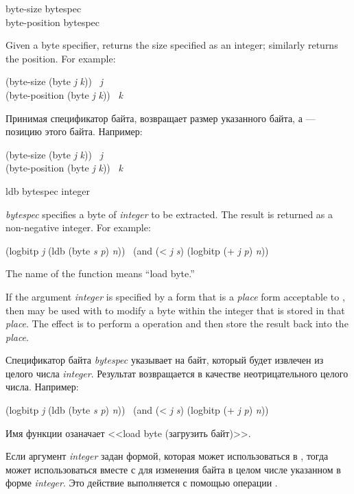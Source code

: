 \begin{defun}[Function]
byte-size bytespec \\
byte-position bytespec

Given a byte specifier,  returns the size specified as an
integer;  similarly returns the position.
For example:
\begin{lisp}
(byte-size (byte \emph{j} \emph{k})) \EQ\ \emph{j} \\
(byte-position (byte \emph{j} \emph{k})) \EQ\ \emph{k}
\end{lisp}

Принимая спецификатор байта,  возвращает размер указанного
байта, а  --- позицию этого байта.
Например:
\begin{lisp}
(byte-size (byte \emph{j} \emph{k})) \EQ\ \emph{j} \\
(byte-position (byte \emph{j} \emph{k})) \EQ\ \emph{k}
\end{lisp}
\end{defun}

\begin{defun}[Function]
ldb bytespec integer

\emph{bytespec} specifies a byte of \emph{integer} to be extracted.
The result is returned as a non-negative integer.
For example:
\begin{lisp}
(logbitp \emph{j} (ldb (byte \emph{s} \emph{p}) \emph{n})) \EQ\ (and (< \emph{j} \emph{s}) (logbitp (+ \emph{j} \emph{p}) \emph{n}))
\end{lisp}
The name of the function  means ``load byte.''

If the argument \emph{integer} is specified by a form that is a \emph{place} form
acceptable to , then
 may be used with  to modify
a byte within the integer that is stored
in that \emph{place}.
The effect is to perform a  operation
and then store the result back into the \emph{place}.

Спецификатор байта \emph{bytespec} указывает на байт, который будет извлечен из
целого числа \emph{integer}.
Результат возвращается в качестве неотрицательного целого числа.
Например:
\begin{lisp}
(logbitp \emph{j} (ldb (byte \emph{s} \emph{p}) \emph{n})) \EQ\ (and (< \emph{j} \emph{s}) (logbitp (+ \emph{j} \emph{p}) \emph{n}))
\end{lisp}
Имя функции  озаначает <<load byte (загрузить байт)>>.

Если аргумент \emph{integer} задан формой, которая может использоваться в
, тогда  может использоваться вместе с  для
изменения байта в целом числе указанном в форме \emph{integer}.
Это действие выполняется с помощью операции .
\end{defun}

